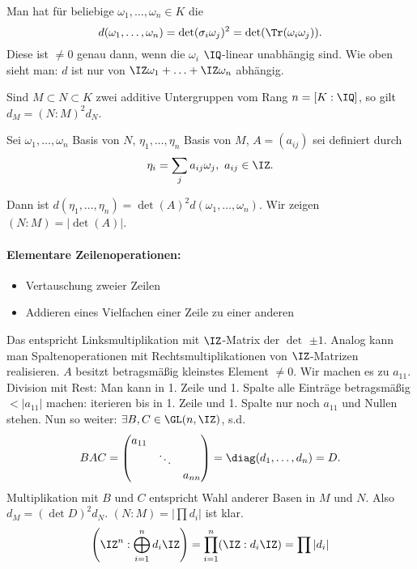 \begin{Bemerkung}
 Man hat für beliebige $\omega_1,\ldots,\omega_n\in K$ die  \[d(\omega_1,\ldots,\omega_n)=\det(\sigma_i\omega_j)^2=\det(\Tr(\omega_i\omega_j)).\]
 Diese ist $\neq 0$ genau dann, wenn die $\omega_i$ $\IQ$-linear unabhängig sind. Wie oben sieht man: $d$ ist nur von $\IZ\omega_1 + \ldots + \IZ\omega_n$ abhängig.
\end{Bemerkung}

\begin{Fakt}
 Sind $M\subset N\subset K$ zwei additive Untergruppen vom Rang $n=[K:\IQ]$, so gilt $d_M=(N:M)^2 d_N$.
\end{Fakt}

\begin{Beweis}
 Sei $\omega_1,\ldots, \omega_n$ Basis von $N$, $\eta_1,\ldots,\eta_n$ Basis von $M$, $A=(a_{ij})$ sei definiert durch
 \[\eta_i=\sum_j a_{ij} \omega_j,\,\, a_{ij}\in\IZ. \]

 Dann ist $d(\eta_1,\ldots,\eta_n)=\det(A)^2 d(\omega_1,\ldots,\omega_n)$. Wir zeigen $(N:M)=|\det(A)|$.
 
 \paragraph{Elementare Zeilenoperationen:} \begin{itemize}
                                            \item Vertauschung zweier Zeilen
                                            \item Addieren eines Vielfachen einer Zeile zu einer anderen
                                           \end{itemize}
Das entspricht Linksmultiplikation mit $\IZ$-Matrix der $\det$ $\pm 1$. Analog kann man Spaltenoperationen mit Rechtsmultiplikationen von $\IZ$-Matrizen realisieren. 
 $A$ besitzt betragsmäßig kleinstes Element $\neq 0$. Wir machen es zu $a_{11}$. Division mit Rest: Man kann in 1. Zeile und 1. Spalte alle Einträge betragsmäßig $< |a_{11}|$ machen: iterieren bis in 1. Zeile und 1. Spalte nur noch $a_{11}$ und Nullen stehen. Nun so weiter: $\exists B,C\in \GL(n,\IZ)$, s.d. 
 \[B A C= \begin{pmatrix}
           a_{11} & &\\
           & \ddots & \\
           & & a_{nn}
          \end{pmatrix}=\diag(d_1,\ldots,d_n)=D.
 \]
 Multiplikation mit $B$ und $C$ entspricht Wahl anderer Basen in $M$ und $N$. Also $d_M=(\det D)^2 d_N$. $(N:M)=|\prod d_i|$ ist klar.
 \[ \left(\IZ^n: \bigoplus_{i=1}^n d_i\IZ\right)=\prod_{i=1}^n(\IZ: d_i\IZ)=\prod |d_i|\]
 \end{Beweis}

